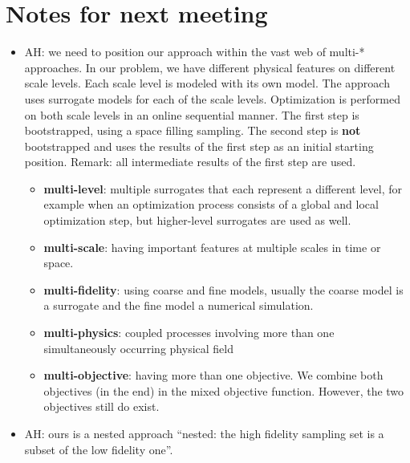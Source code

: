 \documentclass[preprint,12pt]{elsarticle}
\begin{document}
\section{Notes for next meeting}
\begin{itemize}
    \item AH: we need to position our approach within the vast web of multi-* approaches. In our problem, we have different physical features on different scale levels. Each scale level is modeled with its own model. The approach uses surrogate models for each of the scale levels. Optimization is performed on both scale levels in an online sequential manner. The first step is bootstrapped, using a space filling sampling. The second step is \textbf{not} bootstrapped and uses the results of the first step as an initial starting position. Remark: all intermediate results of the first step are used.
    \begin{itemize}
    \item \textbf{multi-level}: multiple surrogates that each represent a different level, for example when an optimization process consists of a global and local optimization step, but higher-level surrogates are used as well.
    \item \textbf{multi-scale}: having important features at multiple scales in time or space.
    \item \textbf{multi-fidelity}: using coarse and fine models, usually the coarse model is a surrogate and the fine model a numerical simulation. 
    \item \textbf{multi-physics}: coupled processes involving more than one simultaneously occurring physical field
    \item \textbf{multi-objective}: having more than one objective. We combine both objectives (in the end) in the mixed objective function. However, the two objectives still do exist.
    \end{itemize}
    \item AH: ours is a nested approach ``nested: the high fidelity sampling set is a subset of the low fidelity one''. 
    
\end{itemize}

\noindent\makebox[\linewidth]{\rule{\paperwidth}{0.4pt}}










\end{document}
